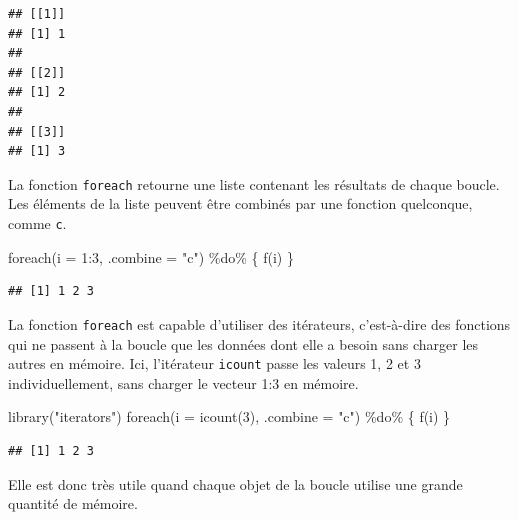 \documentclass[
  11pt,
  french,
  a4paper,
  extrafontsizes,onecolumn,openright
  ]{memoir}
\newenvironment{Shaded}{\begin{snugshade}}{\end{snugshade}}
\newcommand{\AttributeTok}[1]{\textcolor[rgb]{0.77,0.63,0.00}{#1}}
\newcommand{\DecValTok}[1]{\textcolor[rgb]{0.00,0.00,0.81}{#1}}
\newcommand{\FunctionTok}[1]{\textcolor[rgb]{0.00,0.00,0.00}{#1}}
\newcommand{\NormalTok}[1]{#1}
\newcommand{\SpecialCharTok}[1]{\textcolor[rgb]{0.00,0.00,0.00}{#1}}
\newcommand{\StringTok}[1]{\textcolor[rgb]{0.31,0.60,0.02}{#1}}
\begin{document}
\begin{verbatim}
## [[1]]
## [1] 1
## 
## [[2]]
## [1] 2
## 
## [[3]]
## [1] 3
\end{verbatim}

\normalsize

La fonction \texttt{foreach} retourne une liste contenant les résultats de chaque boucle.
Les éléments de la liste peuvent être combinés par une fonction quelconque, comme \texttt{c}.

\scriptsize

\begin{Shaded}
\begin{Highlighting}[]
\FunctionTok{foreach}\NormalTok{(}\AttributeTok{i =} \DecValTok{1}\SpecialCharTok{:}\DecValTok{3}\NormalTok{, }\AttributeTok{.combine =} \StringTok{"c"}\NormalTok{) }\SpecialCharTok{\%do\%}\NormalTok{ \{}
    \FunctionTok{f}\NormalTok{(i)}
\NormalTok{\}}
\end{Highlighting}
\end{Shaded}

\begin{verbatim}
## [1] 1 2 3
\end{verbatim}

\normalsize

La fonction \texttt{foreach} est capable d'utiliser des itérateurs, c'est-à-dire des fonctions qui ne passent à la boucle que les données dont elle a besoin sans charger les autres en mémoire.
Ici, l'itérateur \texttt{icount} passe les valeurs 1, 2 et 3 individuellement, sans charger le vecteur 1:3 en mémoire.

\scriptsize

\begin{Shaded}
\begin{Highlighting}[]
\FunctionTok{library}\NormalTok{(}\StringTok{"iterators"}\NormalTok{)}
\FunctionTok{foreach}\NormalTok{(}\AttributeTok{i =} \FunctionTok{icount}\NormalTok{(}\DecValTok{3}\NormalTok{), }\AttributeTok{.combine =} \StringTok{"c"}\NormalTok{) }\SpecialCharTok{\%do\%}\NormalTok{ \{}
    \FunctionTok{f}\NormalTok{(i)}
\NormalTok{\}}
\end{Highlighting}
\end{Shaded}

\begin{verbatim}
## [1] 1 2 3
\end{verbatim}

\normalsize

Elle est donc très utile quand chaque objet de la boucle utilise une grande quantité de mémoire.
\end{document}
